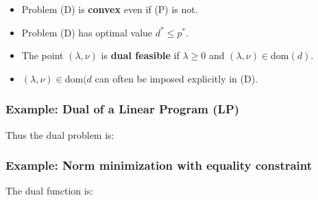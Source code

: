 \documentclass[8pt,a4paper]{scrartcl}
\begin{document}
\begin{multicols*}{3}
\begin{itemize}
\ncompaq
\item Problem (D) is \textbf{convex} even if (P) is not.
\item Problem (D) has optimal value $d^\ast\leq p^\ast$.
\item The point $(\lambda,\nu)$ is \textbf{dual feasible} if $\lambda\geq 0$ and $(\lambda,\nu)\in$dom$(d)$.
\item $(\lambda,\nu)\in$dom$(d$ can often be imposed explicitly in (D).
\end{itemize}

\subsubsection{Example: Dual of a Linear Program (LP)}



Thus the dual problem is:



\subsubsection{Example: Norm minimization with equality constraint}


The dual function is:



\end{multicols*}
\end{document}
